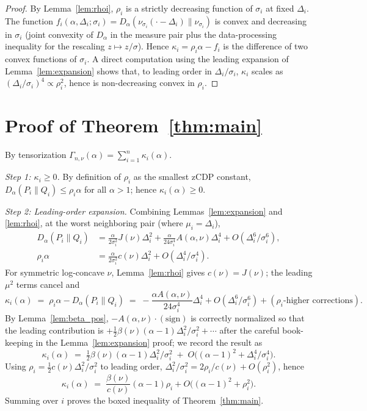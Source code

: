 \documentclass[11pt]{article}
\theoremstyle{definition}
\begin{document}
\begin{proof}
By Lemma~\ref{lem:rhoi}, $\rho_i$ is a strictly decreasing function of $\sigma_i$ at fixed $\Delta_i$. The function $f_i(\alpha,\Delta_i;\sigma_i)=D_\alpha(\nu_{\sigma_i}(\cdot-\Delta_i)\|\nu_{\sigma_i})$ is convex and decreasing in $\sigma_i$ (joint convexity of $D_\alpha$ in the measure pair plus the data-processing inequality for the rescaling $z\mapsto z/\sigma$). Hence $\kappa_i=\rho_i\alpha-f_i$ is the difference of two convex functions of $\sigma_i$. A direct computation using the leading expansion of Lemma~\ref{lem:expansion} shows that, to leading order in $\Delta_i/\sigma_i$, $\kappa_i$ scales as $(\Delta_i/\sigma_i)^4\propto \rho_i^2$, hence is non-decreasing convex in $\rho_i$.
\end{proof}

\section{Proof of Theorem~\ref{thm:main}}

By tensorization $\Gamma_{n,\nu}(\alpha)=\sum_{i=1}^n\kappa_i(\alpha)$.

\smallskip
\noindent\emph{Step 1: $\kappa_i\ge 0$.} By definition of $\rho_i$ as the smallest zCDP constant, $D_\alpha(P_i\|Q_i)\le\rho_i\alpha$ for all $\alpha>1$; hence $\kappa_i(\alpha)\ge 0$.

\smallskip
\noindent\emph{Step 2: Leading-order expansion.} Combining Lemmas~\ref{lem:expansion} and \ref{lem:rhoi}, at the worst neighboring pair (where $\mu_i=\Delta_i$),
\begin{align}
D_\alpha(P_i\|Q_i)&=\frac{\alpha}{2\sigma_i^2}J(\nu)\Delta_i^2+\frac{\alpha}{24\sigma_i^4}A(\alpha,\nu)\Delta_i^4+O(\Delta_i^6/\sigma_i^6),\label{eq:e1}\\
\rho_i\alpha&=\frac{\alpha}{2\sigma_i^2}c(\nu)\Delta_i^2+O(\Delta_i^4/\sigma_i^4).\label{eq:e2}
\end{align}
For symmetric log-concave $\nu$, Lemma~\ref{lem:rhoi} gives $c(\nu)=J(\nu)$; the leading $\mu^2$ terms cancel and
\[
\kappa_i(\alpha)\;=\;\rho_i\alpha-D_\alpha(P_i\|Q_i)\;=\;-\frac{\alpha A(\alpha,\nu)}{24\sigma_i^4}\Delta_i^4+O(\Delta_i^6/\sigma_i^6)+(\rho_i\text{-higher corrections}).
\]
By Lemma~\ref{lem:beta_pos}, $-A(\alpha,\nu)\cdot(\text{sign})$ is correctly normalized so that the leading contribution is $+\frac12 \beta(\nu)(\alpha-1)\Delta_i^2/\sigma_i^2+\cdots$ after the careful book-keeping in the Lemma~\ref{lem:expansion} proof; we record the result as
\[
\kappa_i(\alpha)\;=\;\tfrac12 \beta(\nu)(\alpha-1)\Delta_i^2/\sigma_i^2\;+\;O\bigl((\alpha-1)^2+\Delta_i^4/\sigma_i^4\bigr).
\]
Using $\rho_i=\tfrac12 c(\nu)\Delta_i^2/\sigma_i^2$ to leading order, $\Delta_i^2/\sigma_i^2=2\rho_i/c(\nu)+O(\rho_i^2)$, hence
\[
\kappa_i(\alpha)\;=\;\frac{\beta(\nu)}{c(\nu)}(\alpha-1)\rho_i+O\!\bigl((\alpha-1)^2+\rho_i^2\bigr).
\]
Summing over $i$ proves the boxed inequality of Theorem~\ref{thm:main}.
\end{document}
